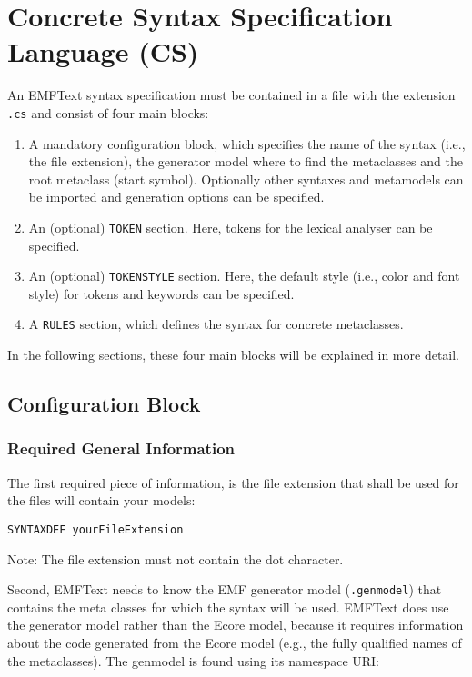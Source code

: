 \chapter{Concrete Syntax Specification Language (CS)}

An EMFText syntax specification must be contained in a file with the extension
\texttt{.cs} and consist of four main blocks:

\begin{enumerate}
  \item A mandatory configuration block, which specifies the name of the syntax
        (i.e., the file extension), the generator model where to find the
        metaclasses and the root metaclass (start symbol). Optionally other
        syntaxes and metamodels can be imported and generation options can be
        specified.
  \item An (optional) \texttt{TOKEN} section. Here, tokens for the lexical
        analyser can be specified.
  \item An (optional) \texttt{TOKENSTYLE} section. Here, the default style
        (i.e., color and font style) for tokens and keywords can be specified.
  \item A \texttt{RULES} section, which defines the syntax for concrete
        metaclasses.
\end{enumerate}

In the following sections, these four main blocks will be explained in more
detail.

\section{Configuration Block}

\subsection{Required General Information}

The first required piece of information, is the file extension that shall
be used for the files will contain your models:

\begin{lstlisting}
SYNTAXDEF yourFileExtension
\end{lstlisting}

Note: The file extension must not contain the dot character.

Second, EMFText needs to know the EMF generator model (\texttt{.genmodel}) that
contains the meta classes for which the syntax will be used. EMFText does use
the generator model rather than the Ecore model, because it requires
information about the code generated from the Ecore model (e.g., the fully
qualified names of the metaclasses). The genmodel is found using its namespace
URI: 

